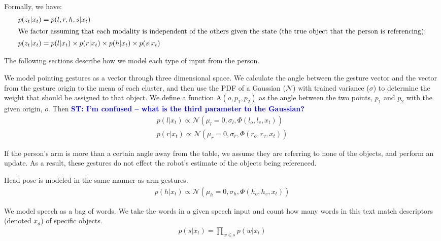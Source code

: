 \documentclass[letterpaper, 10 pt, conference]{ieeeconf}
\newcommand{\stnote}[1]{\textcolor{Blue}{\textbf{ST: #1}}}
\begin{document}
Formally, we have:
\begin{align}
p(z_t | x_t) &= p(l, r, h, s | x_t)\\
\intertext{We factor assuming that each modality is independent of the others given the state (the true object that the person is referencing):}
p(z_t | x_t) &= p(l | x_t) \times p(r | x_t) \times p(h | x_t) \times p(s | x_t)
\end{align}

\noindent The following sections describe how we model each type of
input from the person.

  We model pointing gestures as a vector
through three dimensional space. We calculate the angle between the
gesture vector and the vector from the gesture origin to the mean of
each cluster, and then use the PDF of a Gaussian ($\mathcal{N}$) with
trained variance ($\sigma$) to determine the weight that should be
assigned to that object. We define a function $\mbox{A}(o, p_1, p_2)$ as the
angle between the two points, $p_1$ and $p_2$ with the given origin,
$o$.  Then 
\stnote{I'm confused -- what is the third parameter to the Gaussian?}
\begin{align}
p(l | x_t) \propto \mathcal{N}(\mu_l=0, \sigma_l,\Phi(l_o, l_v, x_t))\\
p(r | x_t) \propto \mathcal{N}(\mu_r=0, \sigma_r,\Phi(r_o, r_v, x_t))
\end{align}

If the person's arm is more than a certain angle away from the table,
we assume they are referring to none of the objects, and perform an
update.  As a result, these gestures do not effect the robot's
estimate of the objects being referenced.

Head pose is modeled in the same manner as arm gestures.
\begin{align}
p(h | x_t) \propto \mathcal{N}(\mu_h=0, \sigma_h,\Phi(h_o, h_v, x_t))
\end{align}


  We model speech as a bag of words. We
take the words in a given speech input and count how many words in
this text match descriptors (denoted $x_d$) of specific objects.
\begin{align}
p(s |x_t) = \displaystyle \prod_{w \in s} p(w | x_t)
\end{align}
\end{document}
